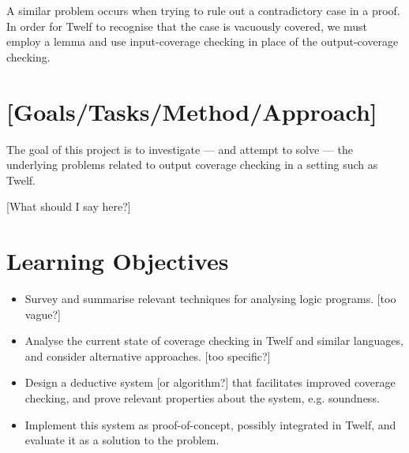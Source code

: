 \documentclass[12pt]{article}
\begin{document}
A similar problem occurs when trying to rule out a contradictory case in a proof.
In order for Twelf to recognise that the case is vacuously covered, we must employ a lemma and use input-coverage checking in place of the output-coverage checking.

\section*{[Goals/Tasks/Method/Approach]}

The goal of this project is to investigate --- and attempt to solve --- the underlying problems related to output coverage checking in a setting such as Twelf.

[What should I say here?]

\section*{Learning Objectives}

\begin{itemize}
	\item Survey and summarise relevant techniques for analysing logic programs. [too vague?]
  \item Analyse the current state of coverage checking in Twelf and similar languages, and consider alternative approaches. [too specific?]
  \item Design a deductive system [or algorithm?] that facilitates improved coverage checking, and prove relevant properties about the system, e.g. soundness.
  \item Implement this system as proof-of-concept, possibly integrated in Twelf, and evaluate it as a solution to the problem.
\end{itemize}
\end{document}
